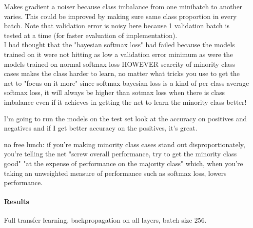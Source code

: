 \documentclass[a4paper,11pt]{article}
\begin{document}
Makes gradient a noiser because class imbalance from one minibatch to another varies. This could be improved by making sure same class proportion in every batch. Note that validation error is noisy here because 1 validation batch is tested at a time (for faster evaluation of implementation). \\

I had thought that the "bayesian softmax loss" had failed
because the models trained on it were not hitting as low a validation error minimum as were the models trained on normal softmax loss
HOWEVER 
scarcity of minority class cases makes the class harder to learn, no matter what tricks you use to get the net to "focus on it more"
since softmax bayesian loss is a kind of per class average softmax loss, it will always be higher than sotmax loss when there is class imbalance
even if it achieves in getting the net to learn the minority class better!

I'm going to run the models on the test set
look at the accuracy on positives and negatives
and if I get better accuracy on the positives, it's great. 

no free lunch: if you're making minority class cases stand out disproportionately, you're telling the net "screw overall performance, try to get the minority class good"
"at the expense of performance on the majority class"
which, when you're taking an unweighted measure of performance such as softmax loss, lowers performance.

\paragraph{Results}

Full transfer learning, backpropagation on all layers, batch size 256. \\
\end{document}
